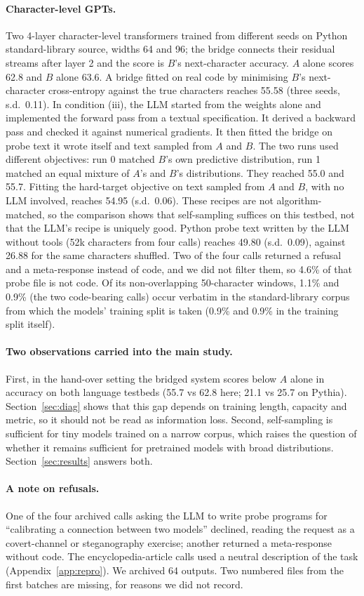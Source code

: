\paragraph{Character-level GPTs.} Two 4-layer character-level transformers trained from different seeds on Python standard-library source, widths 64 and 96; the bridge connects their residual streams after layer 2 and the score is $B$'s next-character accuracy. $A$ alone scores 62.8 and $B$ alone 63.6. A bridge fitted on real code by minimising $B$'s next-character cross-entropy against the true characters reaches 55.58 (three seeds, s.d.\ 0.11). In condition (iii), the LLM started from the weights alone and implemented the forward pass from a textual specification. It derived a backward pass and checked it against numerical gradients. It then fitted the bridge on probe text it wrote itself and text sampled from $A$ and $B$. The two runs used different objectives: run 0 matched $B$'s own predictive distribution, run 1 matched an equal mixture of $A$'s and $B$'s distributions. They reached 55.0 and 55.7. Fitting the hard-target objective on text sampled from $A$ and $B$, with no LLM involved, reaches 54.95 (s.d.\ 0.06). These recipes are not algorithm-matched, so the comparison shows that self-sampling suffices on this testbed, not that the LLM's recipe is uniquely good. Python probe text written by the LLM without tools (52k characters from four calls) reaches 49.80 (s.d.\ 0.09), against 26.88 for the same characters shuffled. Two of the four calls returned a refusal and a meta-response instead of code, and we did not filter them, so 4.6\% of that probe file is not code. Of its non-overlapping 50-character windows, 1.1\% and 0.9\% (the two code-bearing calls) occur verbatim in the standard-library corpus from which the models' training split is taken (0.9\% and 0.9\% in the training split itself).

\paragraph{Two observations carried into the main study.} First, in the hand-over setting the bridged system scores below $A$ alone in accuracy on both language testbeds (55.7 vs 62.8 here; 21.1 vs 25.7 on Pythia). Section~\ref{sec:diag} shows that this gap depends on training length, capacity and metric, so it should not be read as information loss. Second, self-sampling is sufficient for tiny models trained on a narrow corpus, which raises the question of whether it remains sufficient for pretrained models with broad distributions. Section~\ref{sec:results} answers both.

\paragraph{A note on refusals.} One of the four archived calls asking the LLM to write probe programs for ``calibrating a connection between two models'' declined, reading the request as a covert-channel or steganography exercise; another returned a meta-response without code. The encyclopedia-article calls used a neutral description of the task (Appendix~\ref{app:repro}). We archived 64 outputs. Two numbered files from the first batches are missing, for reasons we did not record.
